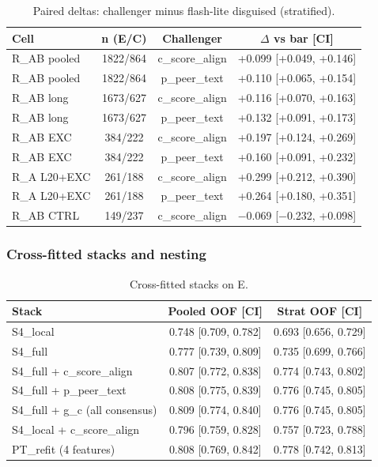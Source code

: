\documentclass[11pt,letterpaper]{article}
\begin{document}
\begin{table}[!htbp]
\centering
\caption{Paired deltas: challenger minus flash-lite disguised (stratified).}
\label{tab:paired_deltas}
\begin{tabular}{lccc}
\toprule
Cell & n (E/C) & Challenger & $\Delta$ vs bar [CI] \\
\midrule
R\_AB pooled & 1822/864 & c\_score\_align & +0.099 [+0.049, +0.146] \\
R\_AB pooled & 1822/864 & p\_peer\_text & +0.110 [+0.065, +0.154] \\
R\_AB long & 1673/627 & c\_score\_align & +0.116 [+0.070, +0.163] \\
R\_AB long & 1673/627 & p\_peer\_text & +0.132 [+0.091, +0.173] \\
R\_AB EXC & 384/222 & c\_score\_align & +0.197 [+0.124, +0.269] \\
R\_AB EXC & 384/222 & p\_peer\_text & +0.160 [+0.091, +0.232] \\
R\_A L20+EXC & 261/188 & c\_score\_align & +0.299 [+0.212, +0.390] \\
R\_A L20+EXC & 261/188 & p\_peer\_text & +0.264 [+0.180, +0.351] \\
R\_AB CTRL & 149/237 & c\_score\_align & $-$0.069 [$-$0.232, +0.098] \\
\bottomrule
\end{tabular}
\end{table}

\subsubsection{Cross-fitted stacks and nesting}

\begin{table}[!htbp]
\centering
\caption{Cross-fitted stacks on E.}
\label{tab:crossfitted_stacks}
\begin{tabular}{lcc}
\toprule
Stack & Pooled OOF [CI] & Strat OOF [CI] \\
\midrule
S4\_local & 0.748 [0.709, 0.782] & 0.693 [0.656, 0.729] \\
S4\_full & 0.777 [0.739, 0.809] & 0.735 [0.699, 0.766] \\
S4\_full + c\_score\_align & 0.807 [0.772, 0.838] & 0.774 [0.743, 0.802] \\
S4\_full + p\_peer\_text & 0.808 [0.775, 0.839] & 0.776 [0.745, 0.805] \\
S4\_full + g\_c (all consensus) & 0.809 [0.774, 0.840] & 0.776 [0.745, 0.805] \\
S4\_local + c\_score\_align & 0.796 [0.759, 0.828] & 0.757 [0.723, 0.788] \\
PT\_refit (4 features) & 0.808 [0.769, 0.842] & 0.778 [0.742, 0.813] \\
\bottomrule
\end{tabular}
\end{table}
\end{document}
